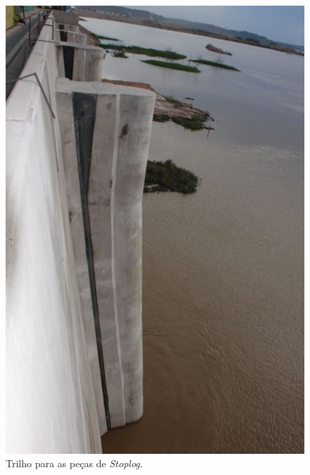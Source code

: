 \begin{figure}[h!]
    \centering \includegraphics[scale=0.6]{figs/jirau/jirau_16}
    \caption{Trilho para as peças de \emph{Stoplog}.}
    \label{fig:jirau16}
\end{figure}

